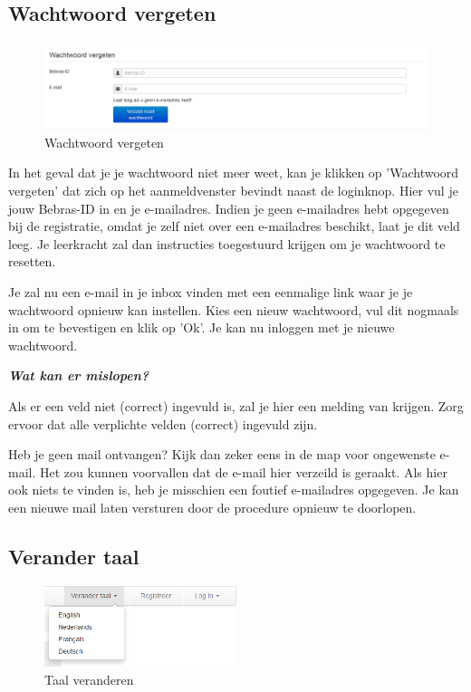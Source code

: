 \documentclass[]{article}
\begin{document}
\subsection{Wachtwoord vergeten}

\begin{figure}[!ht]
	\centering
	\includegraphics[width=1\textwidth]{img/forgotpwd}
	\caption{Wachtwoord vergeten}
	\label{forgotpwd}
\end{figure}

In het geval dat je je wachtwoord niet meer weet, kan je klikken op 'Wachtwoord vergeten' dat zich op het aanmeldvenster bevindt naast de loginknop. Hier vul je jouw Bebras-ID in en je e-mailadres. Indien je geen e-mailadres hebt opgegeven bij de registratie, omdat je zelf niet over een e-mailadres beschikt, laat je dit veld leeg. Je leerkracht zal dan instructies toegestuurd krijgen om je wachtwoord te resetten.

Je zal nu een e-mail in je inbox vinden met een eenmalige link waar je je wachtwoord opnieuw kan instellen. Kies een nieuw wachtwoord, vul dit nogmaals in om te bevestigen en klik op 'Ok'. Je kan nu inloggen met je nieuwe wachtwoord.

\textbf{\textit{Wat kan er mislopen?}}

Als er een veld niet (correct) ingevuld is, zal je hier een melding van krijgen. Zorg ervoor dat alle verplichte velden (correct) ingevuld zijn.

Heb je geen mail ontvangen? Kijk dan zeker eens in de map voor ongewenste e-mail. Het zou kunnen voorvallen dat de e-mail hier verzeild is geraakt. Als hier ook niets te vinden is, heb je misschien een foutief e-mailadres opgegeven. Je kan een nieuwe mail laten versturen door de procedure opnieuw te doorlopen.

\subsection{Verander taal}

\begin{figure}[!ht]
	\centering
	\includegraphics[width=0.5\textwidth]{img/change_lang}
	\caption{Taal veranderen}
	\label{change_lang}
\end{figure}
\end{document}
